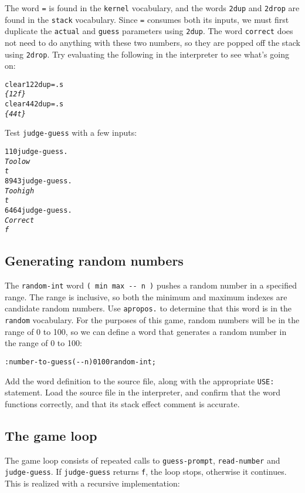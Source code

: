 \documentclass[english]{article}
\begin{document}
The word \texttt{=} is found in the \texttt{kernel} vocabulary, and the words \texttt{2dup} and \texttt{2drop} are found in the \texttt{stack} vocabulary. Since \texttt{=}
consumes both its inputs, we must first duplicate the \texttt{actual} and \texttt{guess} parameters using \texttt{2dup}. The word \texttt{correct} does not need to do anything with these two numbers, so they are popped off the stack using \texttt{2drop}. Try evaluating the following
in the interpreter to see what's going on:

\begin{alltt}
clear 1 2 2dup = .s
\emph{\{ 1 2 f \}}
clear 4 4 2dup = .s
\emph{\{ 4 4 t \}}
\end{alltt}

Test \texttt{judge-guess} with a few inputs:

\begin{alltt}
1 10 judge-guess .
\emph{Too low}
\emph{t}
89 43 judge-guess .
\emph{Too high}
\emph{t}
64 64 judge-guess .
\emph{Correct}
\emph{f}
\end{alltt}

\subsection{Generating random numbers}

The \texttt{random-int} word \texttt{( min max -{}- n )} pushes a
random number in a specified range. The range is inclusive, so both
the minimum and maximum indexes are candidate random numbers. Use
\texttt{apropos.} to determine that this word is in the \texttt{random}
vocabulary. For the purposes of this game, random numbers will be
in the range of 0 to 100, so we can define a word that generates a
random number in the range of 0 to 100:

\begin{alltt}
: number-to-guess ( -{}- n ) 0 100 random-int ;
\end{alltt}
Add the word definition to the source file, along with the appropriate
\texttt{USE:} statement. Load the source file in the interpreter,
and confirm that the word functions correctly, and that its stack
effect comment is accurate.


\subsection{The game loop}

The game loop consists of repeated calls to \texttt{guess-prompt},
\texttt{read-number} and \texttt{judge-guess}. If \texttt{judge-guess}
returns \texttt{f}, the loop stops, otherwise it continues. This is
realized with a recursive implementation:
\end{document}
